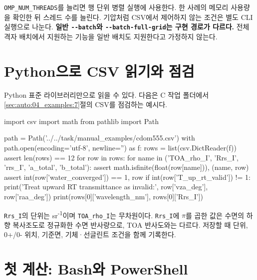 \texttt{OMP\_\allowbreak{}NUM\_\allowbreak{}THREADS}를 늘리면 행 단위 병렬 실행에 사용한다. 한 사례의 메모리 사용량을 확인한 뒤 스레드 수를 늘린다. 기압처럼 CSV에서 제어하지 않는 조건은 별도 CLI 실행으로 나눈다. \textbf{일반 \texttt{-\allowbreak{}-\allowbreak{}batch}와 \texttt{-\allowbreak{}-\allowbreak{}batch-\allowbreak{}full-\allowbreak{}grid}는 구현 경로가 다르다.} 전체 격자 배치에서 지원하는 기능을 일반 배치도 지원한다고 가정하지 않는다.

\section{Python으로 CSV 읽기와 점검}
\label{sec:auto:04_examples:13}
Python 표준 라이브러리만으로 읽을 수 있다. 다음은 C 작업 폴더에서 \ref{sec:auto:04_examples:7}절의 CSV를 점검하는 예시다.


\par\noindent\begin{minipage}{\linewidth}
\begin{ManualCode}
import csv
import math
from pathlib import Path

path = Path('../../task/manual_examples/cdom555.csv')
with path.open(encoding='utf-8', newline='') as f:
    rows = list(csv.DictReader(f))
assert len(rows) == 12
for row in rows:
    for name in ('TOA_rho_I', 'Rrs_I', 'rrs_I', 'a_total', 'b_total'):
        assert math.isfinite(float(row[name])), (name, row)
    assert int(row['water_converged']) == 1, row
    if int(row['T_up_rt_valid']) != 1:
        print('Treat upward RT transmittance as invalid:', row['vza_deg'], row['raa_deg'])
print(rows[0]['wavelength_nm'], rows[0]['Rrs_I'])
\end{ManualCode}
\end{minipage}\par

\texttt{Rrs\_\allowbreak{}I}의 단위는 sr\textsuperscript{-}\textsuperscript{1}이며 \texttt{TOA\_\allowbreak{}rho\_\allowbreak{}I}는 무차원이다. \texttt{Rrs\_\allowbreak{}I}에 \ensuremath{\pi}를 곱한 값은 수면의 하향 복사조도로 정규화한 수면 반사량으로, TOA 반사도와는 다르다. 저장할 때 단위, 0+/0- 위치, 기준면, 기체·선글린트 조건을 함께 기록한다.

\section{첫 계산: Bash와 PowerShell}
\label{sec:auto:04_examples:14}

